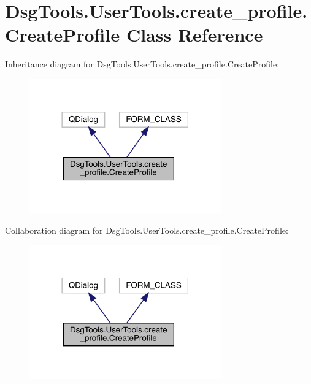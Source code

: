 \hypertarget{class_dsg_tools_1_1_user_tools_1_1create__profile_1_1_create_profile}{}\section{Dsg\+Tools.\+User\+Tools.\+create\+\_\+profile.\+Create\+Profile Class Reference}
\label{class_dsg_tools_1_1_user_tools_1_1create__profile_1_1_create_profile}


Inheritance diagram for Dsg\+Tools.\+User\+Tools.\+create\+\_\+profile.\+Create\+Profile\+:
\nopagebreak
\begin{figure}[H]
\begin{center}
\leavevmode
\includegraphics[width=234pt]{class_dsg_tools_1_1_user_tools_1_1create__profile_1_1_create_profile__inherit__graph}
\end{center}
\end{figure}


Collaboration diagram for Dsg\+Tools.\+User\+Tools.\+create\+\_\+profile.\+Create\+Profile\+:
\nopagebreak
\begin{figure}[H]
\begin{center}
\leavevmode
\includegraphics[width=234pt]{class_dsg_tools_1_1_user_tools_1_1create__profile_1_1_create_profile__coll__graph}
\end{center}
\end{figure}
